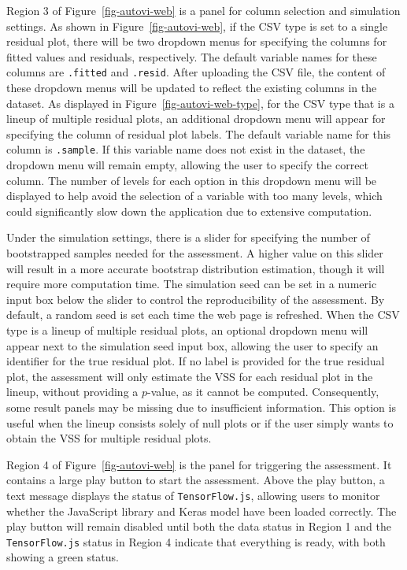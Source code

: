 \documentclass[
doublespace,
  times]{anzsauth}
\begin{document}
Region 3 of Figure~\ref{fig-autovi-web} is a panel for column selection
and simulation settings. As shown in Figure~\ref{fig-autovi-web}, if the
CSV type is set to a single residual plot, there will be two dropdown
menus for specifying the columns for fitted values and residuals,
respectively. The default variable names for these columns are
\texttt{.fitted} and \texttt{.resid}. After uploading the CSV file, the
content of these dropdown menus will be updated to reflect the existing
columns in the dataset. As displayed in
Figure~\ref{fig-autovi-web-type}, for the CSV type that is a lineup of
multiple residual plots, an additional dropdown menu will appear for
specifying the column of residual plot labels. The default variable name
for this column is \texttt{.sample}. If this variable name does not
exist in the dataset, the dropdown menu will remain empty, allowing the
user to specify the correct column. The number of levels for each option
in this dropdown menu will be displayed to help avoid the selection of a
variable with too many levels, which could significantly slow down the
application due to extensive computation.

Under the simulation settings, there is a slider for specifying the
number of bootstrapped samples needed for the assessment. A higher value
on this slider will result in a more accurate bootstrap distribution
estimation, though it will require more computation time. The simulation
seed can be set in a numeric input box below the slider to control the
reproducibility of the assessment. By default, a random seed is set each
time the web page is refreshed. When the CSV type is a lineup of
multiple residual plots, an optional dropdown menu will appear next to
the simulation seed input box, allowing the user to specify an
identifier for the true residual plot. If no label is provided for the
true residual plot, the assessment will only estimate the VSS for each
residual plot in the lineup, without providing a \(p\)-value, as it
cannot be computed. Consequently, some result panels may be missing due
to insufficient information. This option is useful when the lineup
consists solely of null plots or if the user simply wants to obtain the
VSS for multiple residual plots.

Region 4 of Figure~\ref{fig-autovi-web} is the panel for triggering the
assessment. It contains a large play button to start the assessment.
Above the play button, a text message displays the status of
\texttt{TensorFlow.js}, allowing users to monitor whether the JavaScript
library and Keras model have been loaded correctly. The play button will
remain disabled until both the data status in Region 1 and the
\texttt{TensorFlow.js} status in Region 4 indicate that everything is
ready, with both showing a green status.
\end{document}
